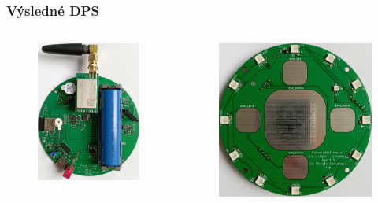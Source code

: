 \documentclass[%
  12pt,       				%
	t,                  %
	aspectratio=1610,   %
	unicode,						%
]{beamer}				    	%
\begin{document}
\begin{frame}
	\frametitle{Výsledné DPS}
	\begin{columns}[T] 	
		\begin{column}{0.5\textwidth}	
			\begin{figure}%
				\centering	          
				\includegraphics[width=0.7\columnwidth]{obrazky/DPS_final_spodni.jpg}
			\end{figure}
		\end{column}

		\begin{column}{0.5\textwidth}	
			\begin{figure}%
				\centering	          
				\includegraphics[width=0.9\columnwidth]{obrazky/DPS_final_vrchni.jpg}
			\end{figure}
		\end{column}
	\end{columns}
\end{frame}
\end{document}
